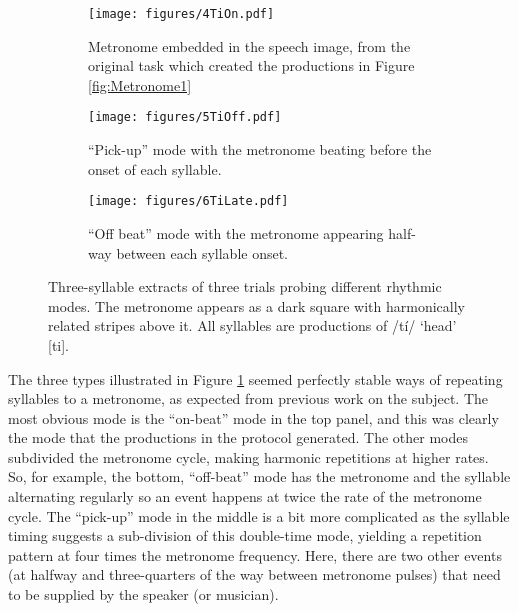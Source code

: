 \documentclass[output=paper,colorlinks,citecolor=brown]{langscibook}
\begin{document}
\begin{figure}
    \centering
    \begin{subfigure}[b]{\textwidth}
        \centering
        \texttt{[image: figures/4TiOn.pdf]}
        \caption{Metronome embedded in the speech image, from the original task which created the productions in Figure \ref{fig:Metronome1}}
    \end{subfigure}
    \hfill
    \begin{subfigure}[b]{\textwidth}
        \centering
        \texttt{[image: figures/5TiOff.pdf]}
        \caption{``Pick-up'' mode with the metronome beating before the onset of each syllable.}
    \end{subfigure}
    \begin{subfigure}[b]{\textwidth}
        \centering
        \texttt{[image: figures/6TiLate.pdf]}
        \caption{``Off beat'' mode with the metronome appearing half-way between each syllable onset.}
    \end{subfigure}
    \caption{Three-syllable extracts of three trials probing different rhythmic modes. The metronome appears as a dark square with harmonically related stripes above it. All syllables are productions of /tí/ ‘head’ [ti].}
    \label{fig:Metronome2}
\end{figure}



The three types illustrated in Figure \ref{fig:Metronome2} seemed perfectly stable ways of repeating syllables to a metronome, as expected from previous work on the subject. The most obvious mode is the ``on-beat'' mode in the top panel, and this was clearly the mode that the productions in the  protocol generated. The other modes subdivided the metronome cycle, making harmonic repetitions at higher rates. So, for example, the bottom, ``off-beat'' mode has the metronome and the syllable alternating regularly so an event happens at twice the rate of the metronome cycle. The ``pick-up'' mode in the middle is a bit more complicated as the syllable timing suggests a sub-division of this double-time mode, yielding a repetition pattern at four times the metronome frequency. Here, there are two other events (at halfway and three-quarters of the way between metronome pulses) that need to be supplied by the speaker (or musician).
\end{document}
